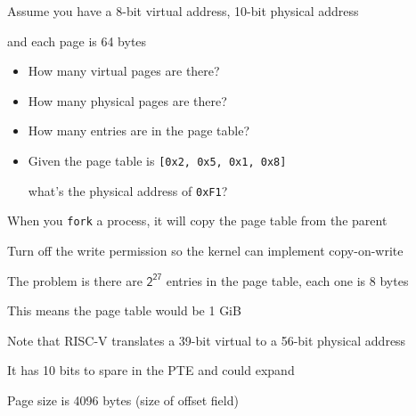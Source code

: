   \begin{slide}


    Assume you have a 8-bit virtual address, 10-bit physical address

    \leftspace{}and each page is 64 bytes
    \medskip

    \begin{itemize}
      \item How many virtual pages are there? 
      \item How many physical pages are there? 
      \item How many entries are in the page table? 
      \item Given the page table is \texttt{{[0x2, 0x5, 0x1, 0x8]}}

            \hspace{2em} what's the physical address of \texttt{0xF1}?

    \end{itemize}

  \end{slide}

  \begin{slide}


    When you \texttt{fork} a process, it will copy the page table from the parent

    \leftspace{}Turn off the write permission so the kernel can implement
    copy-on-write
    \medskip

    The problem is there are $\mathsf{2^{27}}$ entries in the page table, each
    one is 8 bytes

    \leftspace{}This means the page table would be 1 GiB
    \medskip

    Note that RISC-V translates a 39-bit virtual to a 56-bit physical address

    \leftspace{}It has 10 bits to spare in the PTE and could expand

    \leftspace{}Page size is 4096 bytes (size of offset field)

  \end{slide}

